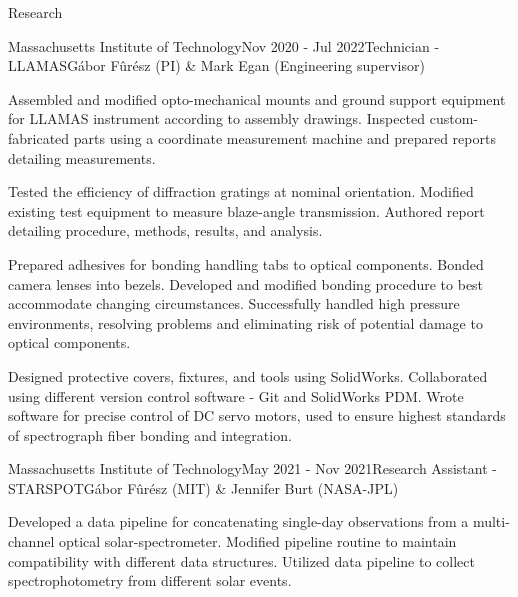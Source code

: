 \documentclass{resume} %
\begin{document}
\begin{rSection}{Research}
\begin{rSubsection}{Massachusetts Institute of Technology}{Nov 2020 - Jul 2022}{Technician - LLAMAS}{G\'abor F\^ur\'esz (PI) \& Mark Egan (Engineering supervisor)}
\item Assembled and modified opto-mechanical mounts and ground support equipment for LLAMAS instrument according to assembly drawings. Inspected custom-fabricated parts using a coordinate measurement machine and prepared reports detailing measurements.
\item Tested the efficiency of diffraction gratings at nominal orientation. Modified existing test equipment to measure blaze-angle transmission. Authored report detailing procedure, methods, results, and analysis.
\item Prepared  adhesives for bonding handling tabs to optical components. Bonded camera lenses into bezels. Developed and modified bonding procedure to best accommodate changing circumstances. Successfully handled high pressure environments, resolving problems and eliminating risk of potential damage to optical components.
\item Designed protective covers, fixtures, and tools using SolidWorks. Collaborated using different version control software - Git and SolidWorks PDM. Wrote software for precise control of DC servo motors, used to ensure highest standards of spectrograph fiber bonding and integration.
\end{rSubsection}
\newpage
\begin{rSubsection}{Massachusetts Institute of Technology}{May 2021 - Nov 2021}{Research Assistant - STARSPOT}{G\'abor F\^ur\'esz (MIT) \& Jennifer Burt (NASA-JPL)}
\item Developed a data pipeline for concatenating single-day observations from a multi-channel optical solar-spectrometer. Modified pipeline routine to maintain compatibility with different data structures. Utilized data pipeline to collect spectrophotometry from different solar events.

\end{rSubsection}
\end{rSection}
\end{document}
